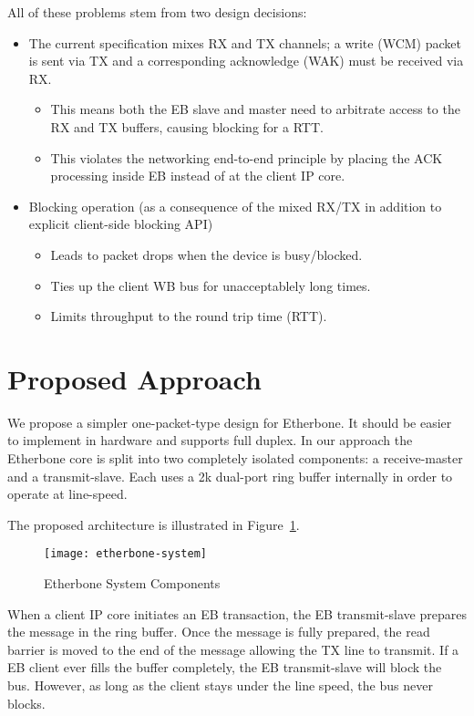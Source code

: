 \documentclass{article}
\begin{document}
All of these problems stem from two design decisions:
\begin{itemize}
\item The current specification mixes RX and TX channels;
a write (WCM) packet is sent via TX and a corresponding acknowledge (WAK) must
be received via RX.
\begin{itemize}
\item This means both the EB slave and master need to arbitrate access to
the RX and TX buffers, causing blocking for a RTT.
\item This violates the networking end-to-end principle by placing the ACK
processing inside EB instead of at the client IP core.
\end{itemize}
\item Blocking operation (as a consequence of the mixed RX/TX in addition to 
explicit client-side blocking API)
\begin{itemize}
\item Leads to packet drops when the device is busy/blocked.
\item Ties up the client WB bus for unacceptablely long times.
\item Limits throughput to the round trip time (RTT).
\end{itemize}
\end{itemize}

\section{Proposed Approach}

We propose a simpler one-packet-type design for Etherbone.
It should be easier to implement in hardware and supports full duplex.
In our approach the Etherbone core is split into two completely isolated
components: a receive-master and a transmit-slave.
Each uses a 2k dual-port ring buffer internally in order to 
operate at line-speed.

The proposed architecture is illustrated in Figure~\ref{fig:design}.
\begin{figure}[t]
 \centering
 \texttt{[image: etherbone-system]}
 \caption{Etherbone System Components}
 \label{fig:design}
\end{figure}

When a client IP core initiates an EB transaction,
the EB transmit-slave prepares the message in the ring buffer.
Once the message is fully prepared, 
the read barrier is moved to the end of the message
allowing the TX line to transmit.
If a EB client ever fills the buffer completely,
the EB transmit-slave will block the bus.
However, as long as the client stays under the line speed,
the bus never blocks.
\end{document}
